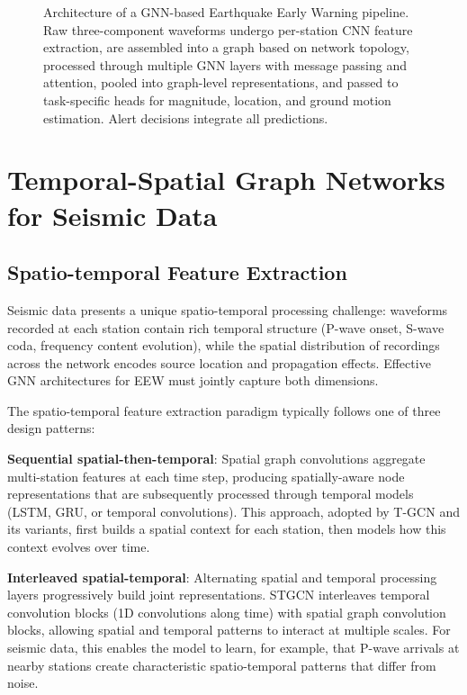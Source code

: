 \documentclass[review,authoryear]{elsarticle}
\begin{document}
\begin{figure}[htbp]
\caption{Architecture of a GNN-based Earthquake Early Warning pipeline. Raw three-component waveforms undergo per-station CNN feature extraction, are assembled into a graph based on network topology, processed through multiple GNN layers with message passing and attention, pooled into graph-level representations, and passed to task-specific heads for magnitude, location, and ground motion estimation. Alert decisions integrate all predictions.}
\label{fig:eew_pipeline}
\end{figure}


\section{Temporal-Spatial Graph Networks for Seismic Data}
\label{sec:temporal_spatial}

\subsection{Spatio-temporal Feature Extraction}

Seismic data presents a unique spatio-temporal processing challenge: waveforms recorded at each station contain rich temporal structure (P-wave onset, S-wave coda, frequency content evolution), while the spatial distribution of recordings across the network encodes source location and propagation effects. Effective GNN architectures for EEW must jointly capture both dimensions.

The spatio-temporal feature extraction paradigm typically follows one of three design patterns:

\textbf{Sequential spatial-then-temporal}: Spatial graph convolutions aggregate multi-station features at each time step, producing spatially-aware node representations that are subsequently processed through temporal models (LSTM, GRU, or temporal convolutions). This approach, adopted by T-GCN \citep{zhao2020tgcn} and its variants, first builds a spatial context for each station, then models how this context evolves over time.

\textbf{Interleaved spatial-temporal}: Alternating spatial and temporal processing layers progressively build joint representations. STGCN \citep{yu2018spatio} interleaves temporal convolution blocks (1D convolutions along time) with spatial graph convolution blocks, allowing spatial and temporal patterns to interact at multiple scales. For seismic data, this enables the model to learn, for example, that P-wave arrivals at nearby stations create characteristic spatio-temporal patterns that differ from noise.
\end{document}
